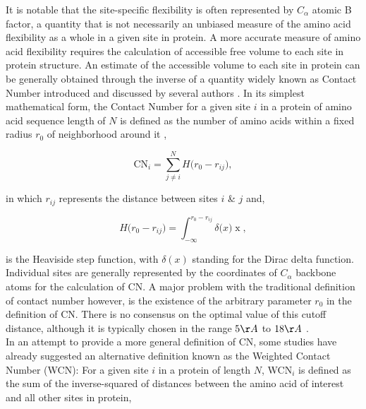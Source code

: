 \documentclass[11pt]{article}
\begin{document}
    It is notable that the site-specific flexibility is often represented by $C_\alpha$ atomic B factor, a quantity that is not necessarily an unbiased measure of the amino acid flexibility as a whole in a given site in protein. A more accurate measure of amino acid flexibility requires the calculation of accessible free volume to each site in protein structure. An estimate of the accessible volume to each site in protein can be generally obtained through the inverse of a quantity widely known as Contact Number introduced and discussed by several authors \citep[e.g.,][]{liao_protein_2005}. In its simplest mathematical form, the Contact Number for a given site $i$ in a protein of amino acid sequence length of $N$ is defined as the number of amino acids within a fixed radius $r_0$ of neighborhood around it \citep[e.g.,][]{franzosa_structural_2009},

    \begin{equation}
        \label{eqn:cn}
        \text{CN}_{i} = \sum^N_{j\neq i} H\big(r_0-r_{ij}\big),
    \end{equation}

    \noindent in which $r_{ij}$ represents the distance between sites $i$ \& $j$ and,

    \begin{equation}
        \label{eqn:heaviside}
        H\big(r_0-r_{ij}\big) = \int^{r_0-r_{ij}}_{-\infty}\delta\big(x)\operatorname{x},
    \end{equation}

    \noindent is the Heaviside step function, with $\delta(x)$ standing for the Dirac delta function. Individual sites are generally represented by the coordinates of $C_\alpha$ backbone atoms for the calculation of CN. A major problem with the traditional definition of contact number however, is the existence of the arbitrary parameter $r_0$ in the definition of CN. There is no consensus on the optimal value of this cutoff distance, although it is typically chosen in the range $5\AA$ to $18\AA$ \citep[e.g.,][]{lin_deriving_2008, franzosa_structural_2009, weng_molecular_2014}. \\

    In an attempt to provide a more general definition of CN, some studies \citep[e.g.,][]{lin_deriving_2008} have already suggested an alternative definition known as the Weighted Contact Number (WCN): For a given site $i$ in a protein of length $N$, WCN$_i$ is defined as the sum of the inverse-squared of distances between the amino acid of interest and all other sites in protein,
\end{document}

